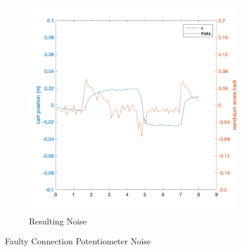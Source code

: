 \documentclass[12pt]{article}
\begin{document}
\begin{figure}[H]
\begin{subfigure}{.4\textwidth}
      \includegraphics[width=1\linewidth]{figures/noise.png}
      \caption{Resulting Noise}
      \label{fig:noise}
    \end{subfigure}
    \caption{Faulty Connection Potentiometer Noise}
    \label{fig:senNoise}
\end{figure}
\end{document}

